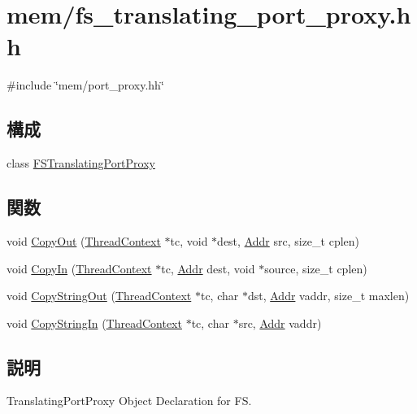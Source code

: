 \hypertarget{fs__translating__port__proxy_8hh}{
\section{mem/fs\_\-translating\_\-port\_\-proxy.hh}
\label{fs__translating__port__proxy_8hh}
}
{\ttfamily \#include \char`\"{}mem/port\_\-proxy.hh\char`\"{}}\par
\subsection*{構成}
\begin{DoxyCompactItemize}
\item 
class \hyperlink{classFSTranslatingPortProxy}{FSTranslatingPortProxy}
\end{DoxyCompactItemize}
\subsection*{関数}
\begin{DoxyCompactItemize}
\item 
void \hyperlink{fs__translating__port__proxy_8hh_a532188374aa989b4aeff3e0a1dff22fe}{CopyOut} (\hyperlink{classThreadContext}{ThreadContext} $\ast$tc, void $\ast$dest, \hyperlink{base_2types_8hh_af1bb03d6a4ee096394a6749f0a169232}{Addr} src, size\_\-t cplen)
\item 
void \hyperlink{fs__translating__port__proxy_8hh_aebd8031c1b14c8ee120ea9a924f4820a}{CopyIn} (\hyperlink{classThreadContext}{ThreadContext} $\ast$tc, \hyperlink{base_2types_8hh_af1bb03d6a4ee096394a6749f0a169232}{Addr} dest, void $\ast$source, size\_\-t cplen)
\item 
void \hyperlink{fs__translating__port__proxy_8hh_a3dba1fb48832b9fc799b4899dcb59128}{CopyStringOut} (\hyperlink{classThreadContext}{ThreadContext} $\ast$tc, char $\ast$dst, \hyperlink{base_2types_8hh_af1bb03d6a4ee096394a6749f0a169232}{Addr} vaddr, size\_\-t maxlen)
\item 
void \hyperlink{fs__translating__port__proxy_8hh_ae5894da106db9f266e5b5de9eeee5231}{CopyStringIn} (\hyperlink{classThreadContext}{ThreadContext} $\ast$tc, char $\ast$src, \hyperlink{base_2types_8hh_af1bb03d6a4ee096394a6749f0a169232}{Addr} vaddr)
\end{DoxyCompactItemize}


\subsection{説明}
TranslatingPortProxy Object Declaration for FS.


